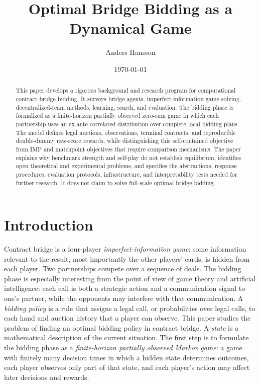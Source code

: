 \documentclass[11pt]{article}
\title{Optimal Bridge Bidding as a Dynamical Game}
\author{Anders Hansson}
\date{\today}
\begin{document}
\maketitle

\begin{abstract}
This paper develops a rigorous background and research program for computational contract-bridge bidding. It surveys bridge agents, imperfect-information game solving, decentralized-team methods, learning, search, and evaluation. The bidding phase is formalized as a finite-horizon partially observed zero-sum game in which each partnership uses an ex-ante-correlated distribution over complete local bidding plans. The model defines legal auctions, observations, terminal contracts, and reproducible double-dummy raw-score rewards, while distinguishing this self-contained objective from IMP and matchpoint objectives that require comparison mechanisms. The paper explains why benchmark strength and self-play do not establish equilibrium, identifies open theoretical and experimental problems, and specifies the abstractions, response procedures, evaluation protocols, infrastructure, and interpretability tests needed for further research. It does not claim to solve full-scale optimal bridge bidding.
\end{abstract}


\section{Introduction}

Contract bridge is a four-player \emph{imperfect-information game}: some information relevant to the result, most importantly the other players' cards, is hidden from each player. Two partnerships compete over a sequence of deals. The bidding phase is especially interesting from the point of view of game theory and artificial intelligence: each call is both a strategic action and a communication signal to one's partner, while the opponents may interfere with that communication. A \emph{bidding policy} is a rule that assigns a legal call, or probabilities over legal calls, to each hand and auction history that a player can observe. This paper studies the problem of finding an optimal bidding policy in contract bridge. A \emph{state} is a mathematical description of the current situation. The first step is to formulate the bidding phase as a \emph{finite-horizon partially observed Markov game}: a game with finitely many decision times in which a hidden state determines outcomes, each player observes only part of that state, and each player's action may affect later decisions and rewards.
\end{document}
